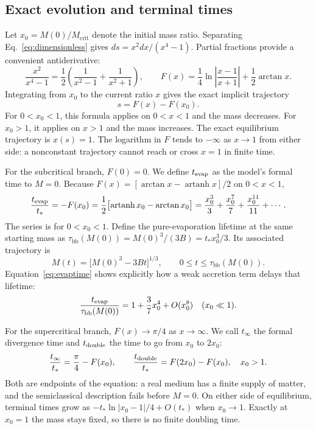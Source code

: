 \documentclass[11pt,a4paper]{article}
\newcommand{\Mcrit}{M_{\mathrm{crit}}}
\newcommand{\tstar}{t_*}
\newcommand{\taubb}{\tau_{\mathrm{bb}}}
\begin{document}
\subsection{Exact evolution and terminal times}
Let $x_0=M(0)/\Mcrit$ denote the initial mass ratio. Separating Eq.~\eqref{eq:dimensionless} gives $ds=x^2dx/(x^4-1)$. Partial fractions provide a convenient antiderivative:
\begin{equation*}
 \frac{x^2}{x^4-1}=\frac12\left(\frac1{x^2-1}+\frac1{x^2+1}\right),\qquad
 F(x)=\frac14\ln\left|\frac{x-1}{x+1}\right|+\frac12\arctan x.
\end{equation*}
Integrating from $x_0$ to the current ratio $x$ gives the exact implicit trajectory
\begin{equation}
 \boxed{s=F(x)-F(x_0)}.
 \label{eq:implicit}
\end{equation}
For $0<x_0<1$, this formula applies on $0<x<1$ and the mass decreases. For $x_0>1$, it applies on $x>1$ and the mass increases. The exact equilibrium trajectory is $x(s)=1$. The logarithm in $F$ tends to $-\infty$ as $x\to1$ from either side: a nonconstant trajectory cannot reach or cross $x=1$ in finite time.

For the subcritical branch, $F(0)=0$. We define $t_{\rm evap}$ as the model's formal time to $M=0$. Because $F(x)=[\arctan x-\operatorname{artanh}x]/2$ on $0<x<1$,
\begin{equation}
 \frac{t_{\rm evap}}{\tstar}=-F(x_0)
 =\frac12\bigl[\operatorname{artanh}x_0-\arctan x_0\bigr]
 =\frac{x_0^3}{3}+\frac{x_0^7}{7}+\frac{x_0^{11}}{11}+\cdots.
 \label{eq:evaptime}
\end{equation}
The series is for $0<x_0<1$. Define the pure-evaporation lifetime at the same starting mass as $\taubb(M(0))=M(0)^3/(3B)=\tstar x_0^3/3$. Its associated trajectory is
\begin{equation*}
 M(t)=\bigl[M(0)^3-3Bt\bigr]^{1/3},\qquad 0\leq t\leq\taubb(M(0)).
\end{equation*}
Equation~\eqref{eq:evaptime} shows explicitly how a weak accretion term delays that lifetime:
\begin{equation}
 \frac{t_{\rm evap}}{\taubb(M(0))}
 =1+\frac37x_0^4+O(x_0^8)\quad (x_0\ll1).
 \label{eq:delay}
\end{equation}

For the supercritical branch, $F(x)\to\pi/4$ as $x\to\infty$. We call $t_\infty$ the formal divergence time and $t_{\rm double}$ the time to go from $x_0$ to $2x_0$:
\begin{equation*}
 \frac{t_\infty}{\tstar}=\frac\pi4-F(x_0),\qquad
 \frac{t_{\rm double}}{\tstar}=F(2x_0)-F(x_0),\quad x_0>1.
\end{equation*}
Both are endpoints of the equation: a real medium has a finite supply of matter, and the semiclassical description fails before $M=0$. On either side of equilibrium, terminal times grow as $-\tstar\ln|x_0-1|/4+O(\tstar)$ when $x_0\to1$. Exactly at $x_0=1$ the mass stays fixed, so there is no finite doubling time.
\end{document}
